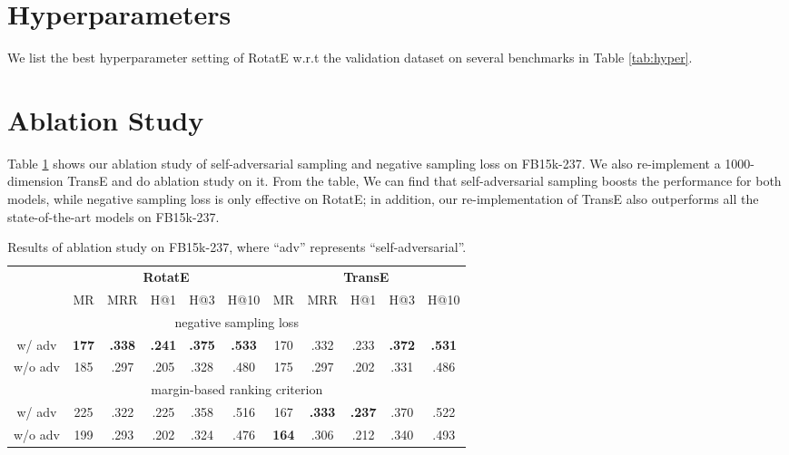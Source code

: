 \documentclass{article} \usepackage{iclr2019_conference,times}
\def\method{RotatE}
\begin{document}
\section{Hyperparameters}
We list the best hyperparameter setting of \method{} w.r.t the validation dataset on several benchmarks in Table \ref{tab:hyper}.







\section{Ablation Study}
Table \ref{tab:ablation} shows our ablation study of self-adversarial sampling and negative sampling loss on FB15k-237. We also re-implement a 1000-dimension TransE and do ablation study on it. From the table, We can find that self-adversarial sampling boosts the performance for both models, while negative sampling loss is only effective on \method{}; in addition, our re-implementation of TransE also outperforms all the state-of-the-art models on FB15k-237.

\begin{table}[t]
\centering
\small
\begin{tabular}{|c|c c c c c|c c c c c|}
\hline
& \multicolumn{5}{c|}{\textbf{\method{}}} & \multicolumn{5}{c|}{\textbf{TransE}}\\
\cline{2-11}
& MR & MRR & H@1 & H@3 & H@10 & MR & MRR & H@1 & H@3 & H@10 \\
\hline
\multicolumn{11}{|c|}{negative sampling loss}\\
\hline
w/ adv & \textbf{177} & \textbf{.338} & \textbf{.241} & \textbf{.375} & \textbf{.533} & 170 & .332 & .233 & \textbf{.372} & \textbf{.531}\\
\hline
w/o adv & 185 & .297 & .205 & .328 & .480 & 175 & .297 & .202 & .331 & .486\\
\hline
\multicolumn{11}{|c|}{margin-based ranking criterion}\\
\hline
w/ adv &  225 & .322 & .225 & .358 & .516 & 167 & \textbf{.333} & \textbf{.237} & .370 & .522\\
\hline
w/o adv & 199 & .293 & .202 & .324 & .476 & \textbf{164} & .306 & .212 & .340 & .493\\
\hline
\end{tabular}
\caption{Results of ablation study on FB15k-237, where ``adv'' represents ``self-adversarial''.}
\label{tab:ablation}
\end{table}
\end{document}
